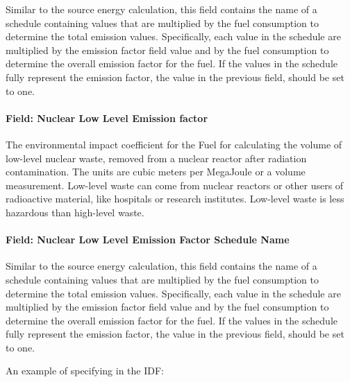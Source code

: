 Similar to the source energy calculation, this field contains the name of a schedule containing values that are multiplied by the fuel consumption to determine the total emission values. Specifically, each value in the schedule are multiplied by the emission factor field value and by the fuel consumption to determine the overall emission factor for the fuel. If the values in the schedule fully represent the emission factor, the value in the previous field, should be set to one.

\paragraph{Field: Nuclear Low Level Emission factor}\label{field-nuclear-low-level-emission-factor}

The environmental impact coefficient for the Fuel for calculating the volume of low-level nuclear waste, removed from a nuclear reactor after radiation contamination. The units are cubic meters per MegaJoule or a volume measurement. Low-level waste can come from nuclear reactors or other users of radioactive material, like hospitals or research institutes. Low-level waste is less hazardous than high-level waste.

\paragraph{Field: Nuclear Low Level Emission Factor Schedule Name}\label{field-nuclear-low-level-emission-factor-schedule-name}

Similar to the source energy calculation, this field contains the name of a schedule containing values that are multiplied by the fuel consumption to determine the total emission values. Specifically, each value in the schedule are multiplied by the emission factor field value and by the fuel consumption to determine the overall emission factor for the fuel. If the values in the schedule fully represent the emission factor, the value in the previous field, should be set to one.

An example of specifying in the IDF:

